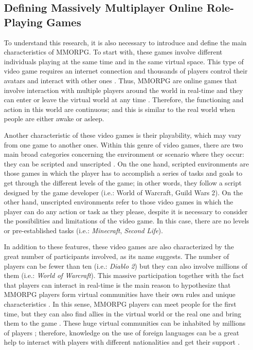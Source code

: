 \documentclass[english]{textolivre}
\begin{document}
\subsection{Defining Massively Multiplayer Online Role-Playing Games}
To understand this research, it is also necessary to introduce and define the main characteristics of MMORPG. To start with, these games involve different individuals playing at the same time and in the same virtual space. This type of video game requires an internet connection and thousands of players control their avatars and interact with other ones \cite{zhong2011}. Thus, MMORPG are online games that involve interaction with multiple players around the world in real-time \cite{barker2012} and they can enter or leave the virtual world at any time \cite{bell2008}. Therefore, the functioning and action in this world are continuous; and this is similar to the real world when people are either awake or asleep.

Another characteristic of these video games is their playability, which may vary from one game to another ones. Within this genre of video games, there are two main broad categories concerning the environment or scenario where they occur: they can be scripted and unscripted \cite{alemi2007}. On the one hand, scripted environments are those games in which the player has to accomplish a series of tasks and goals to get through the different levels of the game; in other words, they follow a script designed by the game developer (i.e.: World of Warcraft, Guild Wars 2). On the other hand, unscripted environments refer to those video games in which the player can do any action or task as they please, despite it is necessary to consider the possibilities and limitations of the video game. In this case, there are no levels or pre-established tasks (i.e.: \emph{Minecraft}, \emph{Second Life}). 

In addition to these features, these video games are also characterized by the great number of participants involved, as its name suggests. The number of players can be fewer than ten (i.e.: \emph{Diablo 2}) but they can also involve millions of them (i.e.: \emph{World of Warcraft}). This massive participation together with the fact that players can interact in real-time is the main reason to hypothesize that MMORPG players form virtual communities have their own rules and unique characteristics \cite{bradley2004, gordon2008}. In this sense, MMORPG players can meet people for the first time, but they can also find allies in the virtual world or the real one and bring them to the game \cite{dickey2007, smith2005}. These huge virtual communities can be inhabited by millions of players \cite{nakamura2009}; therefore, knowledge on the use of foreign languages can be a great help to interact with players with different nationalities and get their support \cite{cornillie2012, reinders2009}.
\end{document}
